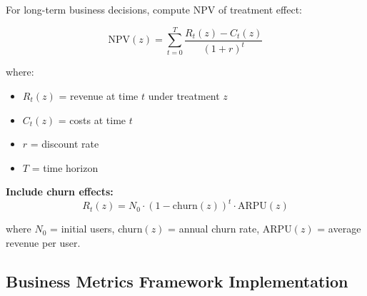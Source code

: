 For long-term business decisions, compute NPV of treatment effect:

\begin{equation}
\text{NPV}(z) = \sum_{t=0}^{T} \frac{R_t(z) - C_t(z)}{(1 + r)^t}
\end{equation}

where:
\begin{itemize}
    \item $R_t(z)$ = revenue at time $t$ under treatment $z$
    \item $C_t(z)$ = costs at time $t$
    \item $r$ = discount rate
    \item $T$ = time horizon
\end{itemize}

\textbf{Include churn effects:}
\begin{equation}
R_t(z) = N_0 \cdot (1 - \text{churn}(z))^t \cdot \text{ARPU}(z)
\end{equation}

where $N_0$ = initial users, churn$(z)$ = annual churn rate, ARPU$(z)$ = average revenue per user.

\subsection{Business Metrics Framework Implementation}

